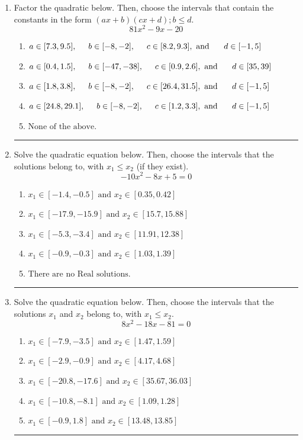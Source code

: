 \documentclass[14pt]{extbook}
\newcommand{\litem}[1]{\item#1\hspace*{-1cm}\rule{\textwidth}{0.4pt}}
\begin{document}
\begin{enumerate}
{\begin{enumerate}[label=\Alph*.]
\end{enumerate} }
\litem{
Factor the quadratic below. Then, choose the intervals that contain the constants in the form $(ax+b)(cx+d); b \leq d.$\[ 81x^{2} -9 x -20 \]\begin{enumerate}[label=\Alph*.]
\item \( a \in [7.3, 9.5], \hspace*{5mm} b \in [-8, -2], \hspace*{5mm} c \in [8.2, 9.3], \text{ and } \hspace*{5mm} d \in [-1, 5] \)
\item \( a \in [0.4, 1.5], \hspace*{5mm} b \in [-47, -38], \hspace*{5mm} c \in [0.9, 2.6], \text{ and } \hspace*{5mm} d \in [35, 39] \)
\item \( a \in [1.8, 3.8], \hspace*{5mm} b \in [-8, -2], \hspace*{5mm} c \in [26.4, 31.5], \text{ and } \hspace*{5mm} d \in [-1, 5] \)
\item \( a \in [24.8, 29.1], \hspace*{5mm} b \in [-8, -2], \hspace*{5mm} c \in [1.2, 3.3], \text{ and } \hspace*{5mm} d \in [-1, 5] \)
\item \( \text{None of the above.} \)

\end{enumerate} }
\litem{
Solve the quadratic equation below. Then, choose the intervals that the solutions belong to, with $x_1 \leq x_2$ (if they exist).\[ -10x^{2} -8 x + 5 = 0 \]\begin{enumerate}[label=\Alph*.]
\item \( x_1 \in [-1.4, -0.5] \text{ and } x_2 \in [0.35, 0.42] \)
\item \( x_1 \in [-17.9, -15.9] \text{ and } x_2 \in [15.7, 15.88] \)
\item \( x_1 \in [-5.3, -3.4] \text{ and } x_2 \in [11.91, 12.38] \)
\item \( x_1 \in [-0.9, -0.3] \text{ and } x_2 \in [1.03, 1.39] \)
\item \( \text{There are no Real solutions.} \)

\end{enumerate} }
\litem{
Solve the quadratic equation below. Then, choose the intervals that the solutions $x_1$ and $x_2$ belong to, with $x_1 \leq x_2$.\[ 8x^{2} -18 x -81 = 0 \]\begin{enumerate}[label=\Alph*.]
\item \( x_1 \in [-7.9, -3.5] \text{ and } x_2 \in [1.47, 1.59] \)
\item \( x_1 \in [-2.9, -0.9] \text{ and } x_2 \in [4.17, 4.68] \)
\item \( x_1 \in [-20.8, -17.6] \text{ and } x_2 \in [35.67, 36.03] \)
\item \( x_1 \in [-10.8, -8.1] \text{ and } x_2 \in [1.09, 1.28] \)
\item \( x_1 \in [-0.9, 1.8] \text{ and } x_2 \in [13.48, 13.85] \)


\end{enumerate}}
\end{enumerate}
\end{document}
